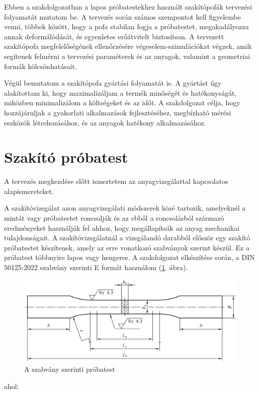 \documentclass[12pt,a4paper,oneside]{report}
\begin{document}
Ebben a szakdolgozatban a lapos próbatestekhez használt szakítópofák tervezési folyamatát mutatom be. A tervezés során számos szempontot kell figyelembe venni, többek között, hogy a pofa stabilan fogja a próbatestet, megakadályozza annak deformálódását, és egyenletes erőátvitelt biztosítson. A tervezett szakítópofa megfelelőségének ellenőrzésére végeselem-szimulációkat végzek, amik segítenek felmérni a tervezési paraméterek és az anyagok, valamint a geometriai formák kölcsönhatásait.

Végül bemutatom a szakítópofa gyártási folyamatát is. A gyártást úgy alakítottam ki, hogy maximalizáljam a termék minőségét és hatékonyságát, miközben minimalizálom a költségeket és az időt. A szakdolgozat célja, hogy hozzájáruljak a gyakorlati alkalmazások fejlesztéséhez, megbízható mérési eszközök létrehozásához, és az anyagok hatékony alkalmazásához.
\newpage

\section{Szakító próbatest}
A tervezés megkezdése előtt ismertetem az anyagvizsgálattal kapcsolatos alapismereteket.

A szakítóvizsgálat azon anyagvizsgálati módszerek közé tartozik, amelyeknél a mintát vagy próbatestet roncsolják és az ebből a roncsolásból származó eredményeket használják fel ahhoz, hogy megállapítsák az anyag mechanikai tulajdonságait. A szakítóvizsgálatnál a vizsgálandó darabból először egy szakító próbatestet készítenek, amely az erre vonatkozó szabványok szerint készül. Ez a próbatest többnyire lapos vagy hengeres. A szakdolgozat elkészítése során, a DIN 50125:2022 szabvány szerinti E formát használom (\ref{Fig:probatest}. ábra).

\begin{figure}[H]
\centering
\includegraphics[width=15cm]{figures/probatest}
\caption{A szabvány szerinti próbatest}
\label{Fig:probatest}
\end{figure}
\noindent ahol:
\end{document}
